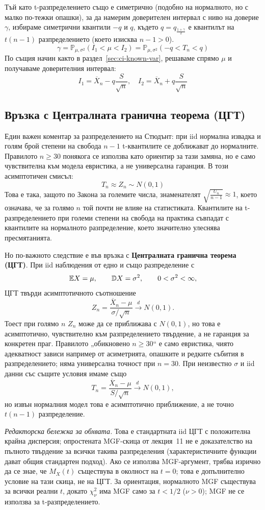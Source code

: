 Тъй като t-разпределението също е симетрично (подобно на нормалното, но с малко по-тежки опашки), за да намерим доверителен интервал с ниво на доверие $\gamma$, избираме симетрични квантили $-q$ и $q$, където $q = q_{\frac{1+\gamma}{2}}$ е квантилът на $t(n-1)$ разпределението (което изисква $n-1>0$).
\[
\gamma = \mathbb{P}_{\mu,\sigma^2}(I_1 < \mu < I_2) = \mathbb{P}_{\mu,\sigma^2}(-q < T_n < q)
\]
По същия начин както в раздел~\ref{sec:ci-known-var}, решаваме спрямо $\mu$ и получаваме доверителния интервал:
\[
I_1 = \overline{X}_n - q \frac{S}{\sqrt{n}}, \quad I_2 = \overline{X}_n + q \frac{S}{\sqrt{n}}
\]

\subsection{Връзка с Централната гранична теорема (ЦГТ)}
Един важен коментар за разпределението на Стюдънт: при iid нормална извадка и голям
брой степени на свобода $n-1$ t-квантилите се доближават до нормалните. Правилото
$n\ge30$ понякога се използва като ориентир за тази замяна, но е само
чувствителна към модела евристика, а не универсална гаранция. В този асимптотичен смисъл:
\[
T_n \approx Z_n \sim N(0,1)
\]
Това е така, защото по Закона за големите числа, знаменателят $\sqrt{\frac{U_n}{n-1}} \approx 1$, което означава, че за голямо $n$ той почти не влияе на статистиката. Квантилите на t-разпределението при големи степени на свобода на практика съвпадат с квантилите на нормалното разпределение, което значително улеснява пресмятанията.

Но по-важното следствие е във връзка с \textbf{Централната гранична теорема (ЦГТ)}. При iid наблюдения от едно и също разпределение с
\[
\mathbb{E} X = \mu, \qquad \mathbb{D} X = \sigma^2, \qquad 0<\sigma^2<\infty,
\]
ЦГТ твърди асимптотичното съотношение
\[
Z_n=\frac{\overline X_n-\mu}{\sigma/\sqrt n}\xrightarrow{d}N(0,1).
\]
Тоест при голямо $n$ $Z_n$ може да се приближава с $N(0,1)$, но това е асимптотично,
чувствително към разпределението твърдение, а не гаранция за конкретен праг. Правилото
„обикновено $n\ge30$“ е само евристика, чиято адекватност зависи например от асиметрията,
опашките и редките събития в разпределението; няма универсална точност при $n=30$.
При неизвестно $\sigma$ и iid данни със същите условия имаме също
\[
T_n=\frac{\overline X_n-\mu}{S/\sqrt n}\xrightarrow{d}N(0,1),
\]
но извън нормалния модел това е асимптотично приближение, а не точно $t(n-1)$ разпределение.

\emph{Редакторска бележка за обхвата.} Това е стандартната iid ЦГТ с положителна крайна
дисперсия; опростената MGF-скица от лекция~11 не е доказателство на пълното твърдение за
всички такива разпределения (характеристичните функции дават общия стандартен подход).
Ако се използва MGF-аргумент, трябва изрично да се знае, че $M_X(t)$ съществува в
околност на $t=0$; това е допълнително условие на тази скица, не на ЦГТ. За ориентация,
нормалното MGF съществува за всички реални $t$, докато $\chi^2_\nu$ има MGF само за
$t<1/2$ ($\nu>0$); MGF не се използва за t-разпределението.

